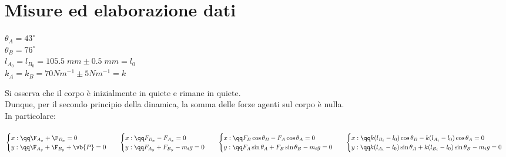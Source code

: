 \section*{Misure ed elaborazione dati}
\everymath{\displaystyle}
$\theta_A = 43^\circ$\\ 
$\theta_B = 76^\circ$\\ 
$l_{A_0} = l_{B_0} = 105.5\;mm \pm 0.5\;mm = l_0$\\ 
$k_A = k_B = 70 Nm^{-1} \pm 5 Nm^{-1} = k$

\snls 
Si osserva che il corpo è inizialmente in quiete e rimane in quiete.\\ 
Dunque, per il secondo principio della dinamica, la somma delle forze agenti sul corpo è nulla.\\ 
In particolare:\\ \\
$
\begin{cases}
    x: \qq \F_{A_x} + \F_{B_x} = 0\\
    y: \qq \F_{A_y} + \F_{B_y} + \vb{P} = 0
\end{cases}
\\ 
\phantom{A}
\\
\begin{cases}
    x: \qq  F_{B_x} - F_{A_x} = 0\\
    y: \qq F_{A_y} + F_{B_y}  -m_ig = 0
\end{cases} 
\\
\phantom{A}
\\
\begin{cases}
    x: \qq  F_{B} \cos \theta_B - F_{A} \cos \theta_A = 0\\
    y: \qq F_{A}\sin \theta_A  + F_{B}\sin \theta_B -m_ig  = 0
\end{cases} 
\\ 
\phantom{A}
\\
\begin{cases}
    x: \qq  k (l_{B_i} - l_0) \cos \theta_B - k (l_{A_i} - l_0) \cos \theta_A = 0\\
    y: \qq k (l_{A_i} - l_0)\sin \theta_A  + k (l_{B_i} - l_0)\sin \theta_B -m_ig  = 0
\end{cases} 
$ 
